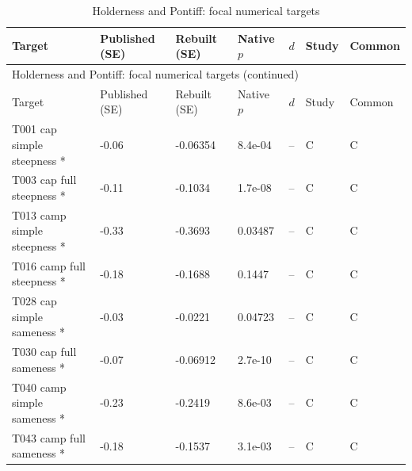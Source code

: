 {\scriptsize\setlength{\tabcolsep}{3pt}\renewcommand{\arraystretch}{1.06}
\begin{longtable}{@{}p{.245\linewidth}p{.17\linewidth}p{.17\linewidth}p{.085\linewidth}p{.060\linewidth}p{.08\linewidth}p{.07\linewidth}@{}}
\caption{Holderness and Pontiff: focal numerical targets}\label{tab:focal:holderness2012}\\
\toprule Target & Published (SE) & Rebuilt (SE) & Native $p$ & $d$ & Study & Common\\\midrule
\endfirsthead\multicolumn{7}{l}{\small Holderness and Pontiff: focal numerical targets (continued)}\\\toprule Target & Published (SE) & Rebuilt (SE) & Native $p$ & $d$ & Study & Common\\\midrule\endhead\bottomrule\endfoot
T001 cap simple steepness * & -0.06 & -0.06354 & 8.4e-04 & -- & C & C\\
T003 cap full steepness * & -0.11 & -0.1034 & 1.7e-08 & -- & C & C\\
T013 camp simple steepness * & -0.33 & -0.3693 & 0.03487 & -- & C & C\\
T016 camp full steepness * & -0.18 & -0.1688 & 0.1447 & -- & C & C\\
T028 cap simple sameness * & -0.03 & -0.0221 & 0.04723 & -- & C & C\\
T030 cap full sameness * & -0.07 & -0.06912 & 2.7e-10 & -- & C & C\\
T040 camp simple sameness * & -0.23 & -0.2419 & 8.6e-03 & -- & C & C\\
T043 camp full sameness * & -0.18 & -0.1537 & 3.1e-03 & -- & C & C\\
\end{longtable}}
